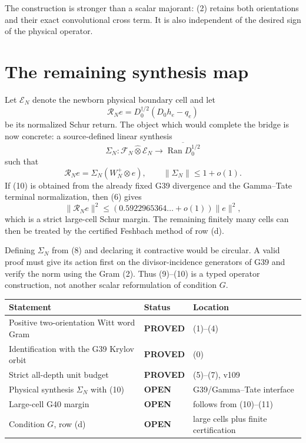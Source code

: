 \documentclass[11pt]{article}
\newcommand{\PROVED}{\textcolor{green!40!black}{\textbf{PROVED}}}
\newcommand{\OPEN}{\textcolor{red!70!black}{\textbf{OPEN}}}
\begin{document}
The construction is stronger than a scalar majorant: (2) retains both
orientations and their exact convolutional cross term.  It is also
independent of the desired sign of the physical operator.

\section{The remaining synthesis map}

Let $\mathscr E_N$ denote the newborn physical boundary cell and let
\begin{equation}
 \mathcal R_Ne=D_0^{\dagger/2}(D_0h_e-q_e)                    \tag{8}
\end{equation}
be its normalized Schur return.  The object which would complete the bridge
is now concrete: a source-defined linear synthesis
\begin{equation}
 \Sigma_N:\mathscr F_N\widehat\otimes\mathscr E_N
       \longrightarrow\overline{\operatorname{Ran}D_0^{1/2}} \tag{9}
\end{equation}
such that
\begin{equation}
 \mathcal R_Ne=\Sigma_N(W_N^+\otimes e),
 \qquad \|\Sigma_N\|\le1+o(1).                              \tag{10}
\end{equation}
If (10) is obtained from the already fixed G39 divergence and the
Gamma--Tate terminal normalization, then (6) gives
\begin{equation}
 \|\mathcal R_Ne\|^2\le(0.5922965364\ldots+o(1))\|e\|^2,     \tag{11}
\end{equation}
which is a strict large-cell Schur margin.  The remaining finitely many
cells can then be treated by the certified Feshbach method of row (d).

Defining $\Sigma_N$ from (8) and declaring it contractive would be
circular.  A valid proof must give its action first on the divisor-incidence
generators of G39 and verify the norm using the Gram (2).  Thus (9)--(10)
is a typed operator construction, not another scalar reformulation of
condition $G$.

\begin{center}
\begin{tabular}{>{\raggedright\arraybackslash}p{.55\linewidth}
                >{\centering\arraybackslash}p{.15\linewidth}
                >{\raggedright\arraybackslash}p{.20\linewidth}}
\toprule
Statement & Status & Location \\
\midrule
Positive two-orientation Witt word Gram & \PROVED & (1)--(4) \\
Identification with the G39 Krylov orbit & \PROVED & (0) \\
Strict all-depth unit budget & \PROVED & (5)--(7), v109 \\
Physical synthesis $\Sigma_N$ with (10) & \OPEN & G39/Gamma--Tate interface \\
Large-cell G40 margin & \OPEN & follows from (10)--(11) \\
Condition $G$, row (d) & \OPEN & large cells plus finite certification \\
\bottomrule
\end{tabular}
\end{center}
\end{document}
